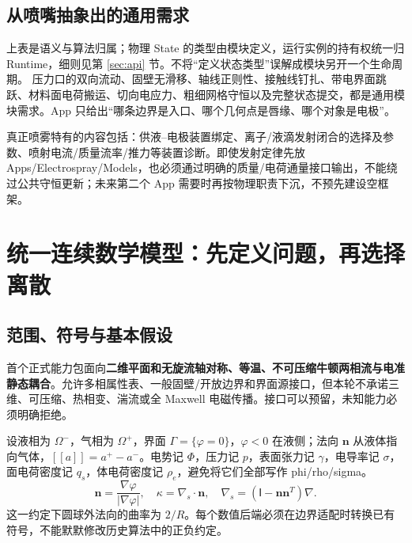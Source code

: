\documentclass[UTF8,a4paper,11pt,fontset=fandol]{ctexart}
\numberwithin{equation}{section}
\newcommand{\nn}{\bm n}
\newcommand{\jump}[1]{[\![#1]\!]}
\newcommand{\mat}[1]{\mathsf{#1}}
\begin{document}
\subsection{从喷嘴抽象出的通用需求}
上表是语义与算法归属；物理 State 的类型由模块定义，运行实例的持有权统一归 Runtime，细则见第 \ref{sec:api} 节。不将“定义状态类型”误解成模块另开一个生命周期。
压力口的双向流动、固壁无滑移、轴线正则性、接触线钉扎、带电界面跳跃、材料面电荷搬运、切向电应力、粗细网格守恒以及完整状态提交，都是通用模块需求。App 只给出“哪条边界是入口、哪个几何点是唇缘、哪个对象是电极”。

真正喷雾特有的内容包括：供液--电极装置绑定、离子/液滴发射闭合的选择及参数、喷射电流/质量流率/推力等装置诊断。即使发射定律先放 Apps/Electrospray/Models，也必须通过明确的质量/电荷通量接口输出，不能绕过公共守恒更新；未来第二个 App 需要时再按物理职责下沉，不预先建设空框架。

\section{统一连续数学模型：先定义问题，再选择离散}\label{sec:model}
\subsection{范围、符号与基本假设}
首个正式能力包面向\textbf{二维平面和无旋流轴对称、等温、不可压缩牛顿两相流与电准静态耦合}。允许多相属性表、一般固壁/开放边界和界面源接口，但本轮不承诺三维、可压缩、热相变、湍流或全 Maxwell 电磁传播。接口可以预留，未知能力必须明确拒绝。

设液相为 $\Omega^-$，气相为 $\Omega^+$，界面 $\Gamma=\{\varphi=0\}$，$\varphi<0$ 在液侧；法向 $\nn$ 从液体指向气体，$\jump a=a^+-a^-$。电势记 $\Phi$，压力记 $p$，表面张力记 $\gamma$，电导率记 $\sigma$，面电荷密度记 $q_s$，体电荷密度记 $\rho_e$，避免将它们全部写作 phi/rho/sigma。
\begin{equation}
 \nn=\frac{\nabla\varphi}{|\nabla\varphi|},\quad
 \kappa=\nabla_s\cdot\nn,\quad
 \nabla_s=(\mat I-\nn\nn^T)\nabla .
\end{equation}
这一约定下圆球外法向的曲率为 $2/R$。每个数值后端必须在边界适配时转换已有符号，不能默默修改历史算法中的正负约定。
\end{document}
